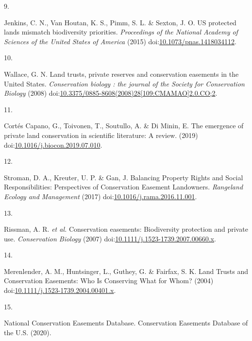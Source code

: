 \documentclass[3p]{elsarticle} %
\newlength{\cslhangindent}
\newlength{\csllabelwidth}
\newlength{\cslentryspacingunit} %
\newenvironment{CSLReferences}[2] %
 {%
  \setlength{\parindent}{0pt}
  \ifodd #1
  \let\oldpar\par
  \def\par{\hangindent=\cslhangindent\oldpar}
  \fi
  \setlength{\parskip}{#2\cslentryspacingunit}
 }%
 {}
\newcommand{\CSLLeftMargin}[1]{\parbox[t]{\csllabelwidth}{#1}}
\newcommand{\CSLRightInline}[1]{\parbox[t]{\linewidth - \csllabelwidth}{#1}\break}
\begin{document}
\begin{CSLReferences}{0}{0}
\leavevmode{}%
\CSLLeftMargin{9. }
\CSLRightInline{Jenkins, C. N., Van Houtan, K. S., Pimm, S. L. \&
Sexton, J. O. {US protected lands mismatch biodiversity priorities}.
\emph{Proceedings of the National Academy of Sciences of the United
States of America} (2015)
doi:\href{https://doi.org/10.1073/pnas.1418034112}{10.1073/pnas.1418034112}.}

\leavevmode{}%
\CSLLeftMargin{10. }
\CSLRightInline{Wallace, G. N. {Land trusts, private reserves and
conservation easements in the United States}. \emph{Conservation biology
: the journal of the Society for Conservation Biology} (2008)
doi:\href{https://doi.org/10.3375/0885-8608(2008)28\%5B109:CMAMAO\%5D2.0.CO;2}{10.3375/0885-8608(2008)28{[}109:CMAMAO{]}2.0.CO;2}.}

\leavevmode{}%
\CSLLeftMargin{11. }
\CSLRightInline{Cortés Capano, G., Toivonen, T., Soutullo, A. \& Di
Minin, E. {The emergence of private land conservation in scientific
literature: A review}. (2019)
doi:\href{https://doi.org/10.1016/j.biocon.2019.07.010}{10.1016/j.biocon.2019.07.010}.}

\leavevmode{}%
\CSLLeftMargin{12. }
\CSLRightInline{Stroman, D. A., Kreuter, U. P. \& Gan, J. {Balancing
Property Rights and Social Responsibilities: Perspectives of
Conservation Easement Landowners}. \emph{Rangeland Ecology and
Management} (2017)
doi:\href{https://doi.org/10.1016/j.rama.2016.11.001}{10.1016/j.rama.2016.11.001}.}

\leavevmode{}%
\CSLLeftMargin{13. }
\CSLRightInline{Rissman, A. R. \emph{et al.} {Conservation easements:
Biodiversity protection and private use}. \emph{Conservation Biology}
(2007)
doi:\href{https://doi.org/10.1111/j.1523-1739.2007.00660.x}{10.1111/j.1523-1739.2007.00660.x}.}

\leavevmode{}%
\CSLLeftMargin{14. }
\CSLRightInline{Merenlender, A. M., Huntsinger, L., Guthey, G. \&
Fairfax, S. K. {Land Trusts and Conservation Easements: Who Is
Conserving What for Whom?} (2004)
doi:\href{https://doi.org/10.1111/j.1523-1739.2004.00401.x}{10.1111/j.1523-1739.2004.00401.x}.}

\leavevmode{}%
\CSLLeftMargin{15. }
\CSLRightInline{National Conservation Easements Database. {Conservation
Easements Database of the U.S.} (2020).}

\end{CSLReferences}
\end{document}

